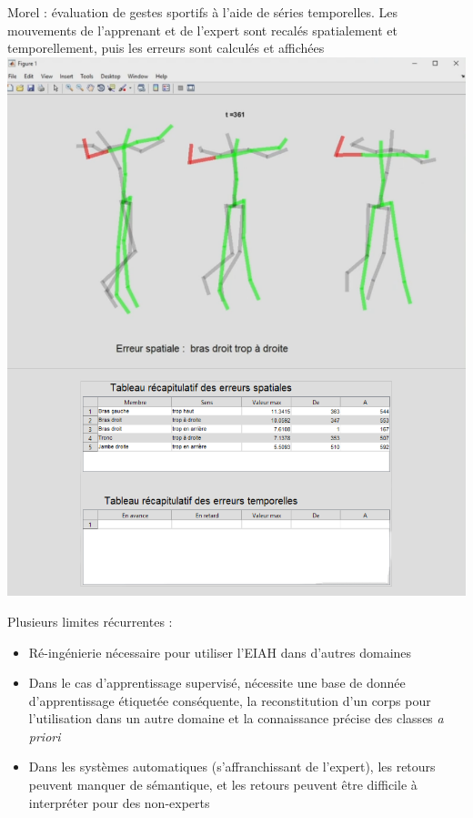     \begin{frame}{\secname}
         Morel : évaluation de gestes sportifs à l'aide de séries temporelles. Les mouvements de l'apprenant et de l'expert sont recalés spatialement et temporellement, puis les erreurs sont calculés et affichées \\
        \centering
        \includegraphics[scale=0.25]{img/eiah_morel.png}
    \end{frame}
    
    
    \begin{frame}{\secname}
        Plusieurs limites récurrentes :
        \begin{itemize}[label=$\bullet$]
            \item Ré-ingénierie nécessaire pour utiliser l'EIAH dans d'autres domaines
            \item Dans le cas d'apprentissage supervisé, nécessite une base de donnée d'apprentissage étiquetée conséquente, la reconstitution d'un corps pour l'utilisation dans un autre domaine et la connaissance précise des classes \textit{a priori}
            \item Dans les systèmes automatiques (s'affranchissant de l'expert), les retours peuvent manquer de sémantique, et les retours peuvent être difficile à interpréter pour des non-experts
        \end{itemize}
    \end{frame} 
    
